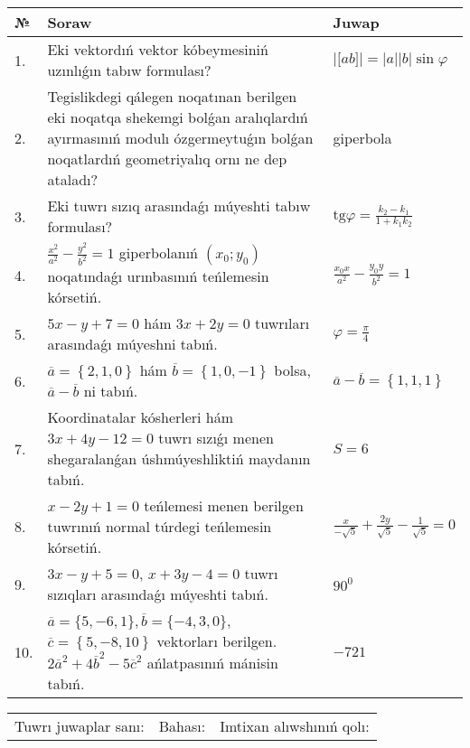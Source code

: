 \documentclass{article}
\begin{document}
\begin{tabular}{|m{0.7cm}|m{10cm}|m{4cm}|}
\hline
№ & Soraw & Juwap \\
\hline
1. & Eki vektordıń vektor kóbeymesiniń uzınlıǵın tabıw formulası? & $\left| \lbrack ab\rbrack \right|=|a||b|\sin\varphi$ \\
\hline
2. & Tegislikdegi qálegen noqatınan berilgen eki noqatqa shekemgi bolǵan aralıqlardıń ayırmasınıń modulı ózgermeytuǵın bolǵan noqatlardıń geometriyalıq ornı ne dep ataladı? & giperbola \\
\hline
3. & Eki tuwrı sızıq arasındaǵı múyeshti tabıw formulası? & $\text{tg}\varphi=\frac{k_2-k_1}{1+k_1k_2}$ \\
\hline
4. & $\frac{x^2}{a^2}-\frac{y^2}{b^2}=1$ giperbolanıń $(x_0;y_0)$ noqatındaǵı urınbasınıń teńlemesin kórsetiń. & $\frac{x_0x}{a^2}-\frac{y_0y}{b^2}=1$ \\
\hline
5. & $5x-y+7=0$ hám $3x+2y=0$ tuwrıları arasındaǵı múyeshni tabıń. & $\varphi=\frac{\pi}{4}$ \\
\hline
6. & $\overline{a}=\left\{ 2, 1, 0 \right\}$ hám $\overline{b}=\left\{ 1, 0,-1 \right\}$ bolsa, $\overline{a}-\overline{b}$ ni tabıń. & $\overline{a} -\overline{b} = \left\{ 1,1,1 \right\}$ \\
\hline
7. & Koordinatalar kósherleri hám $ 3x+4y-12=0 $ tuwrı sızıǵı menen shegaralanǵan úshmúyeshliktiń maydanın tabıń. & $ S=6 $ \\
\hline
8. & $x-2y+1=0$ teńlemesi menen berilgen tuwrınıń normal túrdegi teńlemesin kórsetiń. & $\frac{x}{- \sqrt{5}}+\frac{2y}{\sqrt{5}}-\frac{1}{\sqrt{5}}=0$ \\
\hline
9. & $3x-y+5=0$, $x+3y-4=0$ tuwrı sızıqları arasındaǵı múyeshti tabıń. & $90^{0}$ \\
\hline
10. & $\overline{a}=\{5,-6, 1 \}, \overline{b}=\{-4, 3, 0 \} $, $\overline{c}=\left\{ 5,-8, 10 \right\}$ vektorları berilgen. $2{\overline{a}}^{2}+4{\overline{b}}^{2}-5{\overline{c}}^{2}$ ańlatpasınıń mánisin tabıń. & $-721$ \\
\hline
\end{tabular}

\vspace{1cm}

\begin{tabular}{lll}
Tuwrı juwaplar sanı: \underline{\hspace{1.5cm}} & 
Bahası: \underline{\hspace{1.5cm}} & 
Imtixan alıwshınıń qolı: \underline{\hspace{2cm}} \\
\end{tabular}
\end{document}
